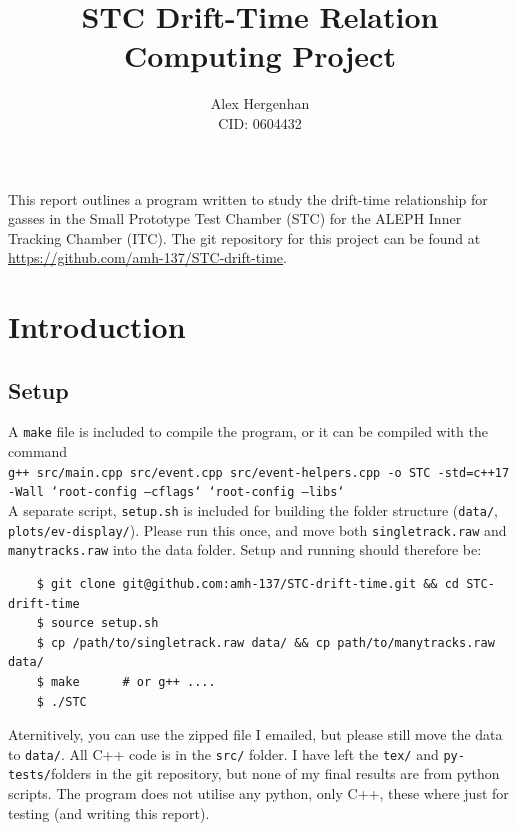 \documentclass[11pt]{article}
\begin{document}
\title{STC Drift-Time Relation\\\normalsize Computing Project}
\author{Alex Hergenhan\\CID: 0604432}
\maketitle

This report outlines a program written to study the drift-time relationship for gasses in the Small Prototype Test Chamber (STC) for the ALEPH Inner Tracking Chamber (ITC). The git repository for this project can be found at \href{https://github.com/amh-137/STC-drift-time}{https://github.com/amh-137/STC-drift-time}.

\section{Introduction}
\label{sec:intro}

\subsection{Setup}
\label{sec:setup}
A \texttt{make} file is included to compile the program, or it can be compiled with the command\\

\texttt{g++ src/main.cpp src/event.cpp src/event-helpers.cpp -o STC -std=c++17 -Wall `root-config --cflags` `root-config --libs`}\\

A separate script, \texttt{setup.sh} is included for building the folder structure (\texttt{data/}, \texttt{plots/ev-display/}). Please run this once, and move both \texttt{singletrack.raw} and \texttt{manytracks.raw} into the data folder. Setup and running should therefore be:
\begin{verbatim}
    $ git clone git@github.com:amh-137/STC-drift-time.git && cd STC-drift-time
    $ source setup.sh
    $ cp /path/to/singletrack.raw data/ && cp path/to/manytracks.raw data/
    $ make      # or g++ ....
    $ ./STC
\end{verbatim}
Aternitively, you can use the zipped file I emailed, but please still move the data to \texttt{data/}. All C++ code is in the \texttt{src/} folder. I have left the \texttt{tex/} and \texttt{py-tests/}folders in the git repository, but none of my final results are from python scripts. The program does not utilise any python, only C++, these where just for testing (and writing this report).
\end{document}
